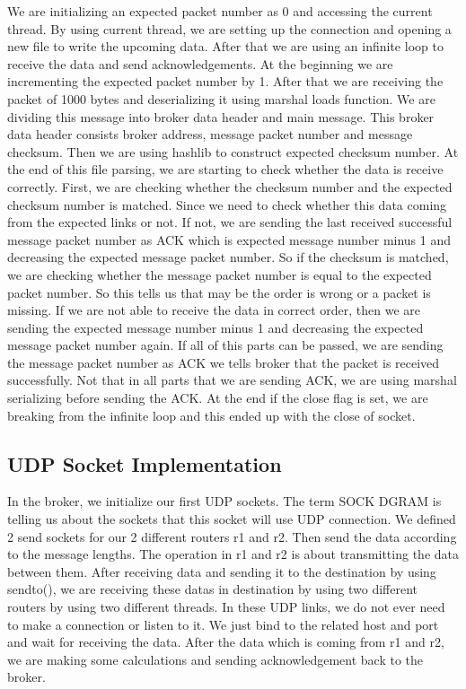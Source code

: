\documentclass[conference]{IEEEtran}
\begin{document}
We are initializing an expected packet number as 0 and accessing the current thread. By using current thread, we are setting up the connection and opening a new file to write the upcoming data. After that we are using an infinite loop to receive the data and send acknowledgements. At the beginning we are incrementing the expected packet number by 1. After that we are receiving the packet of 1000 bytes and deserializing it using marshal loads function. We are dividing this message into broker data header and main message. This broker data header consists broker address, message packet number and message checksum. Then we are using hashlib to construct expected checksum number. At the end of this file parsing, we are starting to check whether the data is receive correctly. First, we are checking whether the checksum number and the expected checksum number is matched. Since we need to check whether this data coming from the expected links or not. If not, we are sending the last received successful message packet number as ACK which is expected message number minus 1 and decreasing the expected message packet number. So if the checksum is matched, we are checking whether the message packet number is equal to the expected packet number. So this tells us that may be the order is wrong or a packet is missing. If we are not able to receive the data in correct order, then we are sending the expected message number minus 1 and decreasing the expected message packet number again. If all of this parts can be passed, we are sending the message packet number as ACK we tells broker that the packet is received successfully. Not that in all parts that we are sending ACK, we are using marshal serializing before sending the ACK. At the end if the close flag is set, we are breaking from the infinite loop and this ended up with the close of socket. 

\subsection{UDP Socket Implementation}

In the broker, we initialize our first UDP sockets. The term SOCK DGRAM is telling us about the sockets that this socket will use UDP connection. We defined 2 send sockets for our 2 different routers r1 and r2. Then send the data according to the message lengths. The operation in r1 and r2 is about transmitting the data between them. After receiving data and sending it to the destination by using sendto(), we are receiving these datas in destination by using two different routers by using two different threads. In these UDP links, we do not ever need to make a connection or listen to it. We just bind to the related host and port and wait for receiving the data. After the data which is coming from r1 and r2, we are making some calculations and sending acknowledgement back to the broker. 
\end{document}
